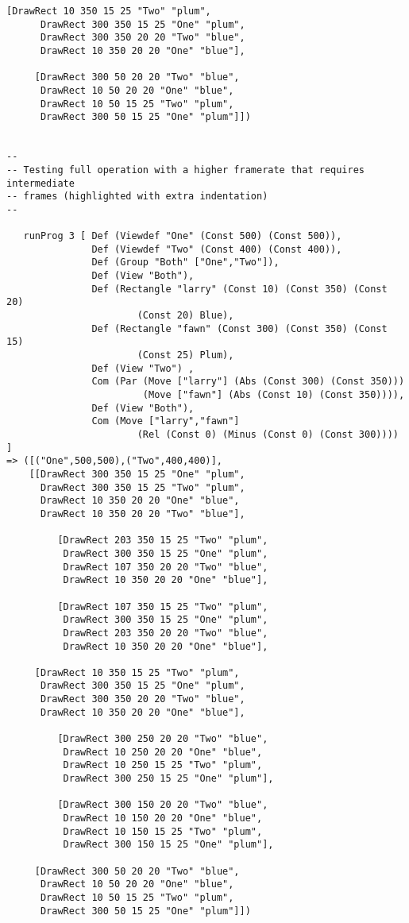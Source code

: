 \documentclass[
paper=a4,
oneside,
fontsize=11pt,
numbers=noenddot,
headinclude=false, %
footinclude=false, %
fleqn,             %
DIV=8
]{scrartcl}
\begin{document}
\begin{lstlisting}[caption=Test output for manual interpreter testing (pretty printed), label=lst:testoutinterp]
     [DrawRect 10 350 15 25 "Two" "plum",
      DrawRect 300 350 15 25 "One" "plum",
      DrawRect 300 350 20 20 "Two" "blue",
      DrawRect 10 350 20 20 "One" "blue"],

     [DrawRect 300 50 20 20 "Two" "blue",
      DrawRect 10 50 20 20 "One" "blue",
      DrawRect 10 50 15 25 "Two" "plum",
      DrawRect 300 50 15 25 "One" "plum"]])


--
-- Testing full operation with a higher framerate that requires intermediate
-- frames (highlighted with extra indentation)
--

   runProg 3 [ Def (Viewdef "One" (Const 500) (Const 500)),
               Def (Viewdef "Two" (Const 400) (Const 400)),
               Def (Group "Both" ["One","Two"]),
               Def (View "Both"),
               Def (Rectangle "larry" (Const 10) (Const 350) (Const 20)
                       (Const 20) Blue),
               Def (Rectangle "fawn" (Const 300) (Const 350) (Const 15)
                       (Const 25) Plum),
               Def (View "Two") ,
               Com (Par (Move ["larry"] (Abs (Const 300) (Const 350)))
                        (Move ["fawn"] (Abs (Const 10) (Const 350)))),
               Def (View "Both"),
               Com (Move ["larry","fawn"]
                       (Rel (Const 0) (Minus (Const 0) (Const 300)))) ]
=> ([("One",500,500),("Two",400,400)],
    [[DrawRect 300 350 15 25 "One" "plum",
      DrawRect 300 350 15 25 "Two" "plum",
      DrawRect 10 350 20 20 "One" "blue",
      DrawRect 10 350 20 20 "Two" "blue"],

         [DrawRect 203 350 15 25 "Two" "plum",
          DrawRect 300 350 15 25 "One" "plum",
          DrawRect 107 350 20 20 "Two" "blue",
          DrawRect 10 350 20 20 "One" "blue"],

         [DrawRect 107 350 15 25 "Two" "plum",
          DrawRect 300 350 15 25 "One" "plum",
          DrawRect 203 350 20 20 "Two" "blue",
          DrawRect 10 350 20 20 "One" "blue"],

     [DrawRect 10 350 15 25 "Two" "plum",
      DrawRect 300 350 15 25 "One" "plum",
      DrawRect 300 350 20 20 "Two" "blue",
      DrawRect 10 350 20 20 "One" "blue"],

         [DrawRect 300 250 20 20 "Two" "blue",
          DrawRect 10 250 20 20 "One" "blue",
          DrawRect 10 250 15 25 "Two" "plum",
          DrawRect 300 250 15 25 "One" "plum"],

         [DrawRect 300 150 20 20 "Two" "blue",
          DrawRect 10 150 20 20 "One" "blue",
          DrawRect 10 150 15 25 "Two" "plum",
          DrawRect 300 150 15 25 "One" "plum"],

     [DrawRect 300 50 20 20 "Two" "blue",
      DrawRect 10 50 20 20 "One" "blue",
      DrawRect 10 50 15 25 "Two" "plum",
      DrawRect 300 50 15 25 "One" "plum"]])
\end{lstlisting}
\end{document}
